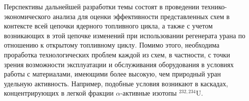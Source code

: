 Перспективы дальнейшей разработки темы состоят в проведении технико-экономического анализа для оценки эффективности представленных схем в контексте всей цепочки ядерного топливного цикла, а также с учетом возникающих в этой цепочке изменений при использовании регенерата урана по отношению к открытому топливному циклу. Помимо этого, необходима проработка технологических проблем каждой из схем, в частности, с точки зрения возможности эксплуатации и обслуживания оборудования в условиях работы с материалами, имеющими более высокую, чем природный уран удельную активность. Например, подобные условия возникают в каскадах, концентрирующих в легкой фракции $\alpha$-активные изотопы $^{232,234}$U.



\insertbibliofull   



